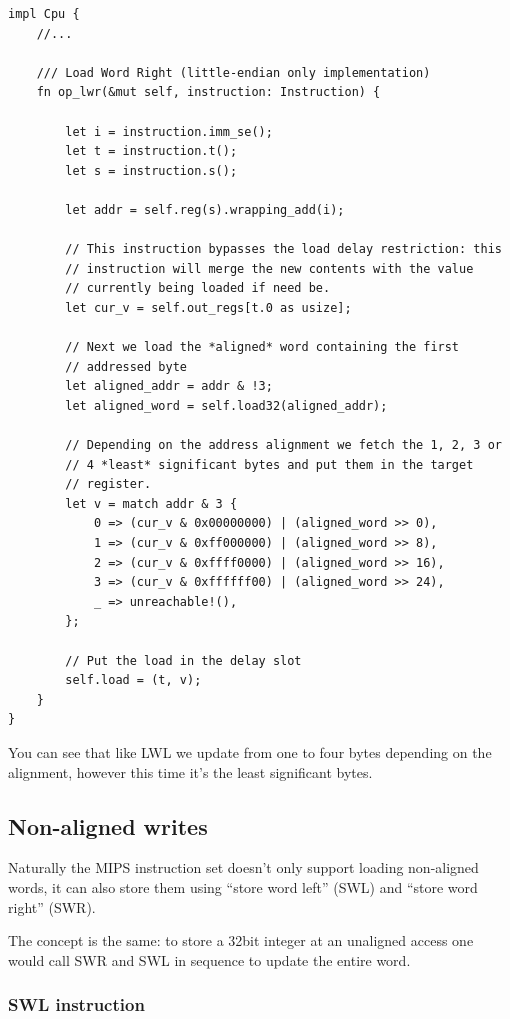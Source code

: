 \documentclass[a4paper]{article}
\begin{document}
\begin{lstlisting}
impl Cpu {
    //...

    /// Load Word Right (little-endian only implementation)
    fn op_lwr(&mut self, instruction: Instruction) {

        let i = instruction.imm_se();
        let t = instruction.t();
        let s = instruction.s();

        let addr = self.reg(s).wrapping_add(i);

        // This instruction bypasses the load delay restriction: this
        // instruction will merge the new contents with the value
        // currently being loaded if need be.
        let cur_v = self.out_regs[t.0 as usize];

        // Next we load the *aligned* word containing the first
        // addressed byte
        let aligned_addr = addr & !3;
        let aligned_word = self.load32(aligned_addr);

        // Depending on the address alignment we fetch the 1, 2, 3 or
        // 4 *least* significant bytes and put them in the target
        // register.
        let v = match addr & 3 {
            0 => (cur_v & 0x00000000) | (aligned_word >> 0),
            1 => (cur_v & 0xff000000) | (aligned_word >> 8),
            2 => (cur_v & 0xffff0000) | (aligned_word >> 16),
            3 => (cur_v & 0xffffff00) | (aligned_word >> 24),
            _ => unreachable!(),
        };

        // Put the load in the delay slot
        self.load = (t, v);
    }
}
\end{lstlisting}

You can see that like LWL we update from one to four bytes depending
on the alignment, however this time it's the least significant bytes.

\subsection{Non-aligned writes}

Naturally the MIPS instruction set doesn't only support loading
non-aligned words, it can also store them using ``store word left''
(SWL) and ``store word right'' (SWR).

The concept is the same: to store a 32bit integer at an unaligned
access one would call SWR and SWL in sequence to update the entire
word.

\subsubsection{SWL instruction}
\end{document}
